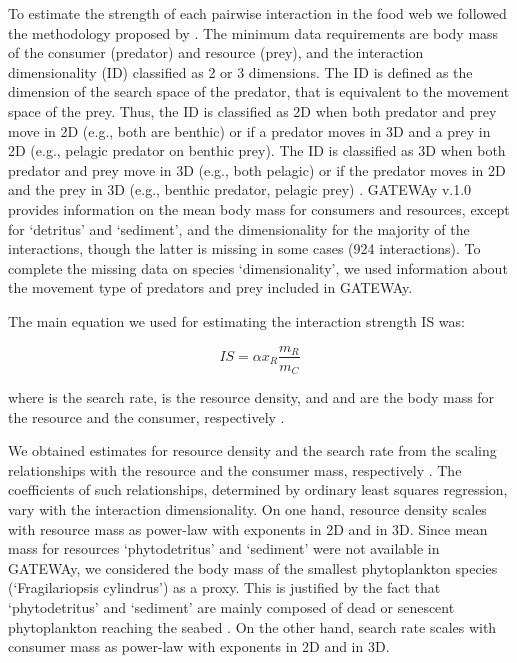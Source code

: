 \documentclass[gc, manuscript]{copernicus}
\begin{document}
To estimate the strength of each pairwise interaction in the food web we
followed the methodology proposed by \citet{Pawar2012}. The minimum data
requirements are body mass of the consumer (predator) and resource
(prey), and the interaction dimensionality (ID) classified as 2 or 3
dimensions. The ID is defined as the dimension of the search space of
the predator, that is equivalent to the movement space of the prey.
Thus, the ID is classified as 2D when both predator and prey move in 2D
(e.g., both are benthic) or if a predator moves in 3D and a prey in 2D
(e.g., pelagic predator on benthic prey). The ID is classified as 3D
when both predator and prey move in 3D (e.g., both pelagic) or if the
predator moves in 2D and the prey in 3D (e.g., benthic predator, pelagic
prey) \citep{Pawar2012}. GATEWAy v.1.0 provides information on the mean
body mass for consumers and resources, except for `detritus' and
`sediment', and the dimensionality for the majority of the interactions,
though the latter is missing in some cases (924 interactions). To
complete the missing data on species `dimensionality', we used
information about the movement type of predators and prey included in
GATEWAy.

The main equation we used for estimating the interaction strength IS
was:

\begin{equation}
IS = \alpha x_R \frac{m_R}{m_C}
\end{equation}

where \vec{\alpha} is the search rate,  is the resource
density, and  and  are the body mass for the resource
and the consumer, respectively \citep{Pawar2012}.

We obtained estimates for resource density and the search rate from the
scaling relationships with the resource and the consumer mass,
respectively \citep{Pawar2012}. The coefficients of such relationships,
determined by ordinary least squares regression, vary with the
interaction dimensionality. On one hand, resource density scales with
resource mass as power-law with exponents in 2D and in 3D. Since mean
mass for resources `phytodetritus' and `sediment' were not available in
GATEWAy, we considered the body mass of the smallest phytoplankton
species (`Fragilariopsis cylindrus') as a proxy. This is justified by
the fact that `phytodetritus' and `sediment' are mainly composed of dead
or senescent phytoplankton reaching the seabed \citep{Wolanski2011}. On
the other hand, search rate scales with consumer mass as power-law with
exponents in 2D and in 3D.
\end{document}

